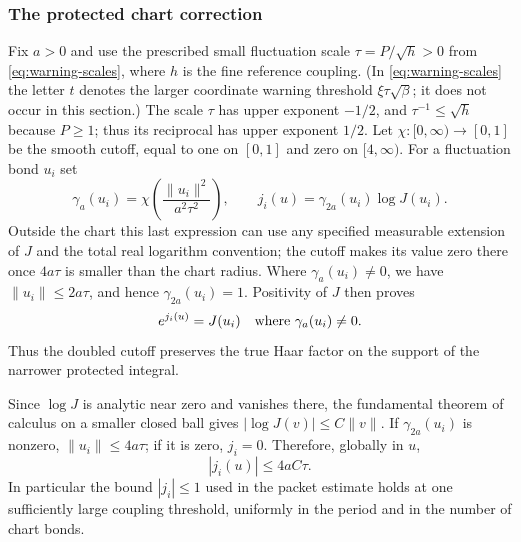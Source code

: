 \subsubsection{The protected chart correction}
Fix $a>0$ and use the prescribed small fluctuation scale
$\tau=P/\sqrt h>0$ from \eqref{eq:warning-scales}, where $h$ is the
fine reference coupling. (In \eqref{eq:warning-scales} the letter $t$
denotes the larger coordinate warning threshold $\xi\tau\sqrt\beta$;
it does not occur in this section.) The scale $\tau$ has upper
exponent $-1/2$, and $\tau^{-1}\le\sqrt h$ because $P\ge1$;
thus its reciprocal has upper exponent $1/2$. Let $\chi:[0,\infty)\to[0,1]$
be the smooth cutoff, equal to one on $[0,1]$ and zero on $[4,\infty)$.
For a fluctuation bond $u_i$ set
\[
 \gamma_a(u_i)=\chi\!\left(\frac{\|u_i\|^2}{a^2\tau^2}\right),
 \qquad j_i(u)=\gamma_{2a}(u_i)\log J(u_i).
\]
Outside the chart this last expression can use any specified measurable
extension of $J$ and the total real logarithm convention; the cutoff
makes its value zero there once $4a\tau$ is smaller than the chart radius.
Where $\gamma_a(u_i)\ne0$, we have $\|u_i\|\le2a\tau$, and hence
$\gamma_{2a}(u_i)=1$. Positivity of $J$ then proves
\begin{equation}\label{eq:haar-chart-exact}
 e^{j_i(u)}=J(u_i)\quad\hbox{where }\gamma_a(u_i)\ne0.
\end{equation}
Thus the doubled cutoff preserves the true Haar factor on the support
of the narrower protected integral.

Since $\log J$ is analytic near zero and vanishes there, the
fundamental theorem of calculus on a smaller closed ball gives
$|\log J(v)|\le C\|v\|$. If $\gamma_{2a}(u_i)$ is nonzero,
$\|u_i\|\le4a\tau$; if it is zero, $j_i=0$. Therefore, globally in $u$,
\begin{equation}\label{eq:haar-chart-value}
 |j_i(u)|\le4aC\tau.
\end{equation}
In particular the bound $|j_i|\le1$ used in the packet estimate holds
at one sufficiently large coupling threshold, uniformly in the period
and in the number of chart bonds.

